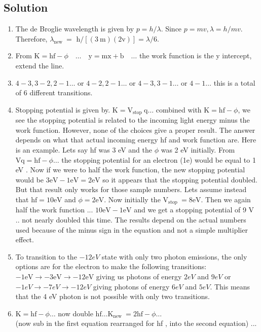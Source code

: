 \begin{enumerate}
\section*{Solution}
\begin{enumerate}
  \item The de Broglie wavelength is given by $p=h / \lambda$. Since $p=m v, \lambda=h / m v$. Therefore, $\lambda_{\text {new }}=$ $\mathrm{h} /[(3 \mathrm{~m})(2 \mathrm{v})]=\lambda / 6$.
  \item From $\mathrm{K}=\mathrm{hf}-\phi \quad \ldots \quad \mathrm{y}=\mathrm{mx}+\mathrm{b} \quad \ldots$ the work function is the y intercept, extend the line.
  \item $4-3,3-2,2-1 \ldots$ or $4-2,2-1 \ldots$ or $4-3,3-1 \ldots$ or $4-1 \ldots$ this is a total of 6 different transitions.
  \item Stopping potential is given by. $\mathrm{K}=\mathrm{V}_{\text {stop }} \mathrm{q} \ldots$ combined with $\mathrm{K}=\mathrm{hf}-\phi$, we see the stopping potential is related to the incoming light energy minus the work function. However, none of the choices give a proper result. The answer depends on what that actual incoming energy hf and work function are. Here is an example. Lets say hf was 3 eV and the $\phi$ was 2 eV initially. From $\mathrm{Vq}=\mathrm{hf}-\phi \ldots$ the stopping potential for an electron (1e) would be equal to 1 eV . Now if we were to half the work function, the new stopping potential would be $3 \mathrm{eV}-1 \mathrm{eV}=2 \mathrm{eV}$ so it appears that the stopping potential doubled. But that result only works for those sample numbers. Lets assume instead that $\mathrm{hf}=10 \mathrm{eV}$ and $\phi=2 \mathrm{eV}$. Now initially the $\mathrm{V}_{\text {stop }}=8 \mathrm{eV}$. Then we again half the work function ... $10 \mathrm{eV}-1 \mathrm{eV}$ and we get a stopping potential of 9 V .. not nearly doubled this time. The results depend on the actual numbers used because of the minus sign in the equation and not a simple multiplier effect.
  \item To transition to the $-12 e V$ state with only two photon emissions, the only options are for the electron to make the following transitions: $-1 \mathrm{eV} \rightarrow-3 \mathrm{eV} \rightarrow-12 \mathrm{eV}$ giving us photons of energy $2 e V$ and $9 e V$ or $-1 e V \rightarrow-7 e V \rightarrow-12 e V$ giving photons of energy $6 e V$ and $5 e V$. This means that the 4 eV photon is not possible with only two transitions.
  \item $\mathrm{K}=\mathrm{hf}-\phi \ldots$ now double $\mathrm{hf} \ldots \mathrm{K}_{\text {new }}=2 \mathrm{hf}-\phi \ldots$\\
(now sub in the first equation rearranged for hf , into the second equation) ...
\end{enumerate}


\end{enumerate}
